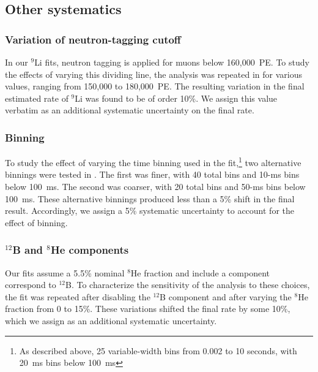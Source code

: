 \documentclass[../thesis.tex]{subfiles}
\begin{document}

\subsection{Other systematics}
\label{sec:bkgLi9FitSyst}

\subsubsection{Variation of neutron-tagging cutoff}
\label{sec:bkgLi9NeuTagCutoff}

In our $^9$Li fits, neutron tagging is applied for muons below 160,000~PE. To study the effects of varying this dividing line, the analysis was repeated in \cite{ChrisLi9} for various values, ranging from 150,000 to 180,000~PE. The resulting variation in the final estimated rate of $^9$Li was found to be of order 10\%. We assign this value verbatim as an additional systematic uncertainty on the final rate.

\subsubsection{Binning}
\label{sec:bkgLi9Binning}

To study the effect of varying the time binning used in the fit,\footnote{As described above, 25 variable-width bins from 0.002 to 10 seconds, with 20~ms bins below 100~ms} two alternative binnings were tested in \cite{ChrisLi9}. The first was finer, with 40 total bins and 10-ms bins below 100~ms. The second was coarser, with 20 total bins and 50-ms bins below 100~ms. These alternative binnings produced less than a 5\% shift in the final result. Accordingly, we assign a 5\% systematic uncertainty to account for the effect of binning.

\subsubsection{$^{12}$B and $^8$He components}
\label{sec:bkgLi9B12unc}

Our fits assume a 5.5\% nominal $^8$He fraction and include a component correspond to $^{12}$B.
To characterize the sensitivity of the analysis to these choices, the fit was repeated after disabling the $^{12}$B component and after varying the $^8$He fraction from 0 to 15\%. These variations shifted the final rate by some 10\%, which we assign as an additional systematic uncertainty.
\end{document}
